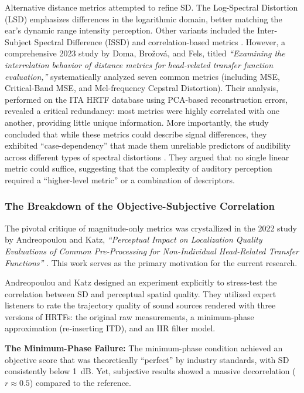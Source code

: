 \documentclass[12pt,a4paper]{article}
\begin{document}
Alternative distance metrics attempted to refine SD. The Log-Spectral Distortion (LSD) emphasizes differences in the logarithmic domain, better matching the ear's dynamic range intensity perception. Other variants included the Inter-Subject Spectral Difference (ISSD) and correlation-based metrics \cite{doma2023}. However, a comprehensive 2023 study by Doma, Bro\v{z}ov\'{a}, and Fels, titled \textit{``Examining the interrelation behavior of distance metrics for head-related transfer function evaluation,''} systematically analyzed seven common metrics (including MSE, Critical-Band MSE, and Mel-frequency Cepstral Distortion). Their analysis, performed on the ITA HRTF database using PCA-based reconstruction errors, revealed a critical redundancy: most metrics were highly correlated with one another, providing little unique information. More importantly, the study concluded that while these metrics could describe signal differences, they exhibited ``case-dependency'' that made them unreliable predictors of audibility across different types of spectral distortions \cite{doma2023}. They argued that no single linear metric could suffice, suggesting that the complexity of auditory perception required a ``higher-level metric'' or a combination of descriptors.

\subsubsection{The Breakdown of the Objective-Subjective Correlation}

The pivotal critique of magnitude-only metrics was crystallized in the 2022 study by Andreopoulou and Katz, \textit{``Perceptual Impact on Localization Quality Evaluations of Common Pre-Processing for Non-Individual Head-Related Transfer Functions''} \cite{andreopoulou2022}. This work serves as the primary motivation for the current research.

Andreopoulou and Katz designed an experiment explicitly to stress-test the correlation between SD and perceptual spatial quality. They utilized expert listeners to rate the trajectory quality of sound sources rendered with three versions of HRTFs: the original raw measurements, a minimum-phase approximation (re-inserting ITD), and an IIR filter model.

\textbf{The Minimum-Phase Failure:} The minimum-phase condition achieved an objective score that was theoretically ``perfect'' by industry standards, with SD consistently below 1~dB. Yet, subjective results showed a massive decorrelation ($r \approx 0.5$) compared to the reference.
\end{document}
